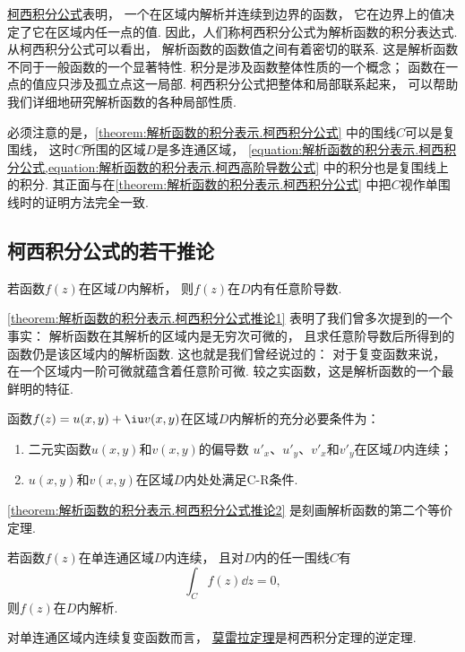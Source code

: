 \hyperref[equation:解析函数的积分表示.柯西积分公式]{柯西积分公式}表明，
一个在区域内解析并连续到边界的函数，
它在边界上的值决定了它在区域内任一点的值.
因此，人们称柯西积分公式为解析函数的积分表达式.
从柯西积分公式可以看出，
解析函数的函数值之间有着密切的联系.
这是解析函数不同于一般函数的一个显著特性.
积分是涉及函数整体性质的一个概念；
函数在一点的值应只涉及孤立点这一局部.
柯西积分公式把整体和局部联系起来，
可以帮助我们详细地研究解析函数的各种局部性质.

必须注意的是，\cref{theorem:解析函数的积分表示.柯西积分公式} 中的围线\(C\)可以是复围线，
这时\(C\)所围的区域\(D\)是多连通区域，
\cref{equation:解析函数的积分表示.柯西积分公式,equation:解析函数的积分表示.柯西高阶导数公式} 中的积分也是复围线上的积分.
其正面与在\cref{theorem:解析函数的积分表示.柯西积分公式} 中把\(C\)视作单围线时的证明方法完全一致.

\subsection{柯西积分公式的若干推论}
\begin{corollary}\label{theorem:解析函数的积分表示.柯西积分公式推论1}
若函数\(f(z)\)在区域\(D\)内解析，
则\(f(z)\)在\(D\)内有任意阶导数.
\end{corollary}
\cref{theorem:解析函数的积分表示.柯西积分公式推论1}
表明了我们曾多次提到的一个事实：
解析函数在其解析的区域内是无穷次可微的，
且求任意阶导数后所得到的函数仍是该区域内的解析函数.
这也就是我们曾经说过的：
对于复变函数来说，
在一个区域内一阶可微就蕴含着任意阶可微.
较之实函数，这是解析函数的一个最鲜明的特征.

\begin{corollary}\label{theorem:解析函数的积分表示.柯西积分公式推论2}
函数\(f(z)=u(x,y)+\iu v(x,y)\)在区域\(D\)内解析的充分必要条件为：
\begin{enumerate}
	\item 二元实函数\(u(x,y)\)和\(v(x,y)\)的偏导数
	\(u'_x\)、\(u'_y\)、\(v'_x\)和\(v'_y\)在区域\(D\)内连续；

	\item \(u(x,y)\)和\(v(x,y)\)在区域\(D\)内处处满足C-R条件.
\end{enumerate}
\end{corollary}
\cref{theorem:解析函数的积分表示.柯西积分公式推论2} 是刻画解析函数的第二个等价定理.

\begin{theorem}[莫雷拉定理]\label{theorem:解析函数的积分表示.莫雷拉定理}
若函数\(f(z)\)在单连通区域\(D\)内连续，
且对\(D\)内的任一围线\(C\)有\begin{equation*}
	\int_C f(z) \dd{z} = 0,
\end{equation*}
则\(f(z)\)在\(D\)内解析.
\end{theorem}
对单连通区域内连续复变函数而言，
\hyperref[theorem:解析函数的积分表示.莫雷拉定理]{莫雷拉定理}是柯西积分定理的逆定理.

